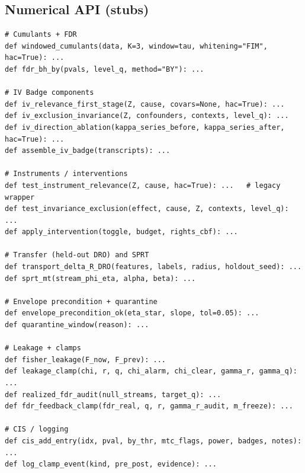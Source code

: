 \documentclass[10pt]{article}
\begin{document}
\subsection*{Numerical API (stubs)}
\begin{lstlisting}
# Cumulants + FDR
def windowed_cumulants(data, K=3, window=tau, whitening="FIM", hac=True): ...
def fdr_bh_by(pvals, level_q, method="BY"): ...

# IV Badge components
def iv_relevance_first_stage(Z, cause, covars=None, hac=True): ...
def iv_exclusion_invariance(Z, confounders, contexts, level_q): ...
def iv_direction_ablation(kappa_series_before, kappa_series_after, hac=True): ...
def assemble_iv_badge(transcripts): ...

# Instruments / interventions
def test_instrument_relevance(Z, cause, hac=True): ...   # legacy wrapper
def test_invariance_exclusion(effect, cause, Z, contexts, level_q): ...
def apply_intervention(toggle, budget, rights_cbf): ...

# Transfer (held-out DRO) and SPRT
def transport_delta_R_DRO(features, labels, radius, holdout_seed): ...
def sprt_mt(stream_phi_eta, alpha, beta): ...

# Envelope precondition + quarantine
def envelope_precondition_ok(eta_star, slope, tol=0.05): ...
def quarantine_window(reason): ...

# Leakage + clamps
def fisher_leakage(F_now, F_prev): ...
def leakage_clamp(chi, r, q, chi_alarm, chi_clear, gamma_r, gamma_q): ...
def realized_fdr_audit(null_streams, target_q): ...
def fdr_feedback_clamp(fdr_real, q, r, gamma_r_audit, m_freeze): ...

# CIS / logging
def cis_add_entry(idx, pval, by_thr, mtc_flags, power, badges, notes): ...
def log_clamp_event(kind, pre_post, evidence): ...
\end{lstlisting}
\end{document}
